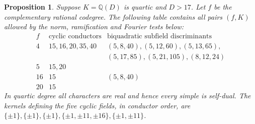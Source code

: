 \documentclass[11pt,a4paper]{article}
\newtheorem{proposition}[theorem]{Proposition}
\numberwithin{equation}{section}
\begin{document}
\begin{proposition}\label{prop:quartic-field-list}
Suppose $K=\mathbb Q(D)$ is quartic and $D>17$. Let $f$ be the complementary rational codegree. The following table contains all pairs $(f,K)$ allowed by the norm, ramification and Fourier tests below:
\[
\begin{array}{c|l|l}
 f&\text{cyclic conductors}&\text{biquadratic subfield discriminants}\\\hline
 4 &15,16,20,35,40 &(5,8,40),(5,12,60),(5,13,65),\\
   &&(5,17,85),(5,21,105),(8,12,24)\\
 5 &15,20& \\
 16&15&(5,8,40)\\
 20&15&
\end{array}
\]
In quartic degree all characters are real and hence every simple is self-dual. The kernels defining the five cyclic fields, in conductor order, are
$\{\pm1\},\{\pm1\},\{\pm1\},\{\pm1,\pm11,\pm16\},\{\pm1,\pm11\}$.
\end{proposition}
\end{document}
